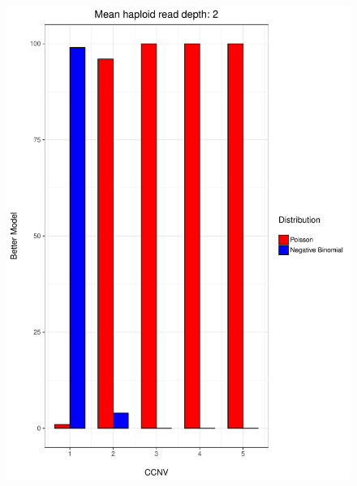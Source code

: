 \documentclass[11pt]{article}
\begin{document}
\begin{figure}
\begin{center}
\includegraphics[scale=0.28]{../Results/Second_Analysis/Better_model_bar2.pdf}

\end{center}
\end{figure}
\end{document}
